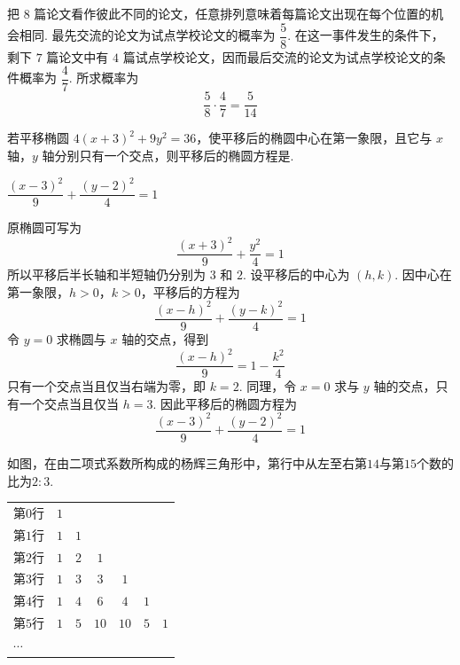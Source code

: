 \begin{solution}
把 \(8\) 篇论文看作彼此不同的论文，任意排列意味着每篇论文出现在每个位置的机会相同. 最先交流的论文为试点学校论文的概率为 \(\dfrac{5}{8}\). 在这一事件发生的条件下，剩下 \(7\) 篇论文中有 \(4\) 篇试点学校论文，因而最后交流的论文为试点学校论文的条件概率为 \(\dfrac{4}{7}\). 所求概率为
\[
\frac{5}{8}\cdot\frac{4}{7}=\frac{5}{14}
\]
\end{solution}

\begin{problem}
若平移椭圆 \(4(x+3)^2+9y^2=36\)，使平移后的椭圆中心在第一象限，且它与 \(x\) 轴，\(y\) 轴分别只有一个交点，则平移后的椭圆方程是\fillinblank{}.
\end{problem}

\begin{answer}
\(\dfrac{(x-3)^2}{9}+\dfrac{(y-2)^2}{4}=1\)
\end{answer}

\begin{solution}
原椭圆可写为
\[
\frac{(x+3)^2}{9}+\frac{y^2}{4}=1
\]
所以平移后半长轴和半短轴仍分别为 \(3\) 和 \(2\). 设平移后的中心为 \((h,k)\). 因中心在第一象限，\(h>0\)，\(k>0\)，平移后的方程为
\[
\frac{(x-h)^2}{9}+\frac{(y-k)^2}{4}=1
\]
令 \(y=0\) 求椭圆与 \(x\) 轴的交点，得到
\[
\frac{(x-h)^2}{9}=1-\frac{k^2}{4}
\]
只有一个交点当且仅当右端为零，即 \(k=2\). 同理，令 \(x=0\) 求与 \(y\) 轴的交点，只有一个交点当且仅当 \(h=3\). 因此平移后的椭圆方程为
\[
\frac{(x-3)^2}{9}+\frac{(y-2)^2}{4}=1
\]
\end{solution}

\begin{problem}
如图，在由二项式系数所构成的杨辉三角形中，第\fillinblank{}行中从左至右第\(14\)与第\(15\)个数的比为\(2:3\).

\begin{center}
\small
\begin{tabular}{@{}lcccccc@{}}
第\(0\)行 & \(1\) & & & & & \\
第\(1\)行 & \(1\) & \(1\) & & & & \\
第\(2\)行 & \(1\) & \(2\) & \(1\) & & & \\
第\(3\)行 & \(1\) & \(3\) & \(3\) & \(1\) & & \\
第\(4\)行 & \(1\) & \(4\) & \(6\) & \(4\) & \(1\) & \\
第\(5\)行 & \(1\) & \(5\) & \(10\) & \(10\) & \(5\) & \(1\) \\
\(\cdots\) & & & & & &
\end{tabular}
\end{center}
\end{problem}

